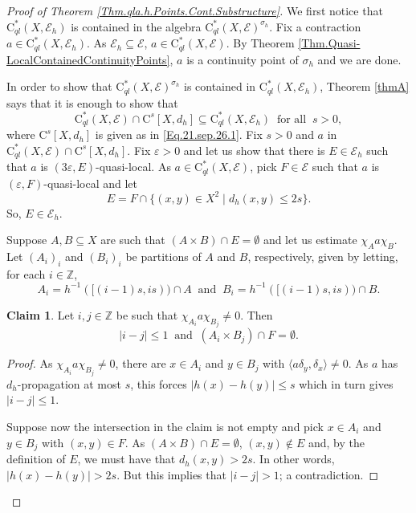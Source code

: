 \documentclass[11pt]{amsart}
\newcommand{\Z}{\mathbb{Z}}
\newcommand{\cE}{\mathcal{E}}
\newcommand{\eps}{\varepsilon}
\newcommand{\cstql}{\mathrm{C}^*_{\textit{ql}}}
\numberwithin{equation}{section}
\theoremstyle{definition}
\newtheorem{claim}[theorem]{Claim}
\theoremstyle{remark}
\begin{document}
\begin{proof}[Proof of Theorem \ref{Thm.qla.h.Points.Cont.Substructure}]
We first notice that $\cstql(X,\cE_h)$ is contained in the algebra $\cstql(X,\cE)^{\sigma_h}$. Fix a contraction  $a\in \cstql(X,\cE_h)$. As $\cE_h\subseteq \cE$, $a\in \cstql(X,\cE)$. By Theorem \ref{Thm.Quasi-LocalContainedContinuityPoints},  $a$ is a continuity point of $\sigma_h$ and we are done.

In order to show that $\cstql(X,\cE)^{\sigma_h}$ is contained in $\cstql(X,\cE_h)$, Theorem \ref{thmA} says that it is enough to show that \[\cstql(X,\cE)\cap \mathrm C^s[X,d_{h}]\subseteq \cstql(X,\cE_h)\ \text{ for all } \ s>0,\]
where $\mathrm C^s[X,d_h]$ is given as in \eqref{Eq.21.sep.26.1}.
 Fix $s>0$ and $a$ in $\cstql(X,\cE)\cap \mathrm C^s[X,d_{h}]$. Fix $\eps>0$ and let us show that there is $E\in \cE_h$ such that $a$ is $(3\eps,E)$-quasi-local. As $a\in \cstql(X,\cE)$, pick $F\in \cE$ such that $a$ is $(\eps,F)$-quasi-local and let
\[E=F\cap \{(x,y)\in X^2\mid d_h(x,y)\leq 2s\}.\]
So, $E \in \cE_h$.

Suppose $A,B\subseteq X$ are such that $(A\times B)\cap E=\emptyset$ and let us estimate $\chi_Aa\chi_B$. Let $(A_i)_i$ and $(B_i)_i$ be partitions of $A$ and $B$, respectively, given by letting,  for each $i\in \Z$,
\[A_i=h^{-1}([(i-1)s,is))\cap A\ \text{ and } \ B_i=h^{-1}([(i-1)s,is))\cap B.\]

\begin{claim}
    Let $i,j\in\Z$ be such that $\chi_{A_i}a\chi_{B_j}\neq 0$. Then
    \[|i-j|\leq 1\ \text{ and }\ (A_i\times B_j)\cap F=\emptyset.\]
\end{claim}


\begin{proof}
As $\chi_{A_i}a\chi_{B_j}\neq 0$, there are  $x\in A_i$ and $y\in B_j$ with $\langle a\delta_y,\delta_x\rangle\neq 0$. As $a$ has $d_h$-propagation at most $s$, this forces $|h(x)-h(y)|\leq s$ which in turn gives  $|i-j|\leq 1$.

Suppose now the intersection in the claim is not empty and pick  $x\in A_i$ and $y\in B_j$ with  $(x,y)\in F$. As $(A\times B)\cap E=\emptyset$, $(x,y)\not\in E$ and, by the definition of $E$, we must have that $d_h(x,y)>2s$. In other words, $|h(x)-h(y)|>2s$. But this implies that $|i-j|>1$; a contradiction.
\end{proof}


\end{proof}
\end{document}
